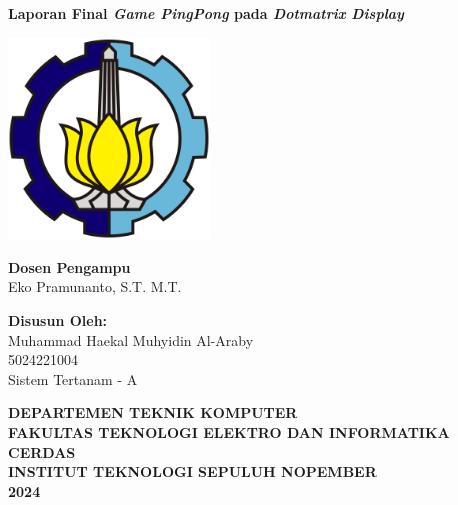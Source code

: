 \documentclass[a4paper,12pt]{article}
\begin{document}
\begin{titlepage}
    \centering
    \vspace*{1cm}
    {\Large \textbf{Laporan Final \textit{Game PingPong} pada \textit{Dotmatrix Display}}}
    \vfill
    \vspace{2cm}

    \includegraphics[width=0.4\textwidth]{./images/logo.png}
    \vfill

    \vspace{1cm}
    \begin{onehalfspace}
    \textbf{Dosen Pengampu}\\
    Eko Pramunanto, S.T. M.T.

    \vspace{1cm}

    \textbf{Disusun Oleh:}\\
    Muhammad Haekal Muhyidin Al-Araby\\
    5024221004\\
    Sistem Tertanam - A
    \end{onehalfspace}

    \vfill

    \textbf{DEPARTEMEN TEKNIK KOMPUTER\\
    FAKULTAS TEKNOLOGI ELEKTRO DAN INFORMATIKA CERDAS\\
    INSTITUT TEKNOLOGI SEPULUH NOPEMBER\\2024}
\end{titlepage}
\end{document}
